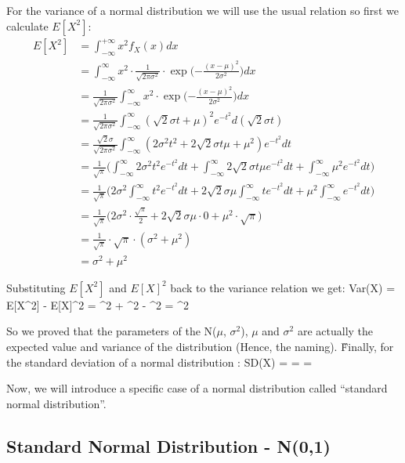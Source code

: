For the variance of a normal distribution we will use the usual relation so first we calculate $E[X^2]$:
\begingroup
\allowdisplaybreaks
{\setlength{\jot}{11pt}
\begin{align*}
E[X^2] &= \int_{-\infty}^{+\infty} x^2 f_{X}(x) dx \\
&= \int_{-\infty}^\infty x^2 \cdot \frac{1}{\sqrt{2\pi\sigma^2}}
\cdot \exp \Big( {-\frac{(x - \mu)^2}{2\sigma^2}} \Big) dx \\
&= \frac{1}{\sqrt{2\pi\sigma^2}} \int_{-\infty}^\infty x^2 \cdot \exp \Big( {-\frac{(x - \mu)^2}{2\sigma^2}} \Big) dx\\
&= \frac{1}{\sqrt{2\pi\sigma^2}} \int_{-\infty}^\infty (\sqrt{2} \sigma t + \mu)^2 e^{-t^2} d (\sqrt{2} \sigma t) \\
&= \frac{\sqrt{2} \sigma}{\sqrt{2\pi\sigma^2}} \int_{-\infty}^\infty (2 \sigma^2 t^2
+ 2 \sqrt{2} \sigma t \mu + \mu^2) e ^ {-t^2} dt\\
&= \frac{1}{\sqrt{\pi}} \Big( \int_{-\infty}^\infty 2 \sigma^2 t^2 e^ {-t^2} dt
+ \int_{-\infty}^\infty 2 \sqrt{2} \sigma t \mu e ^ {-t^2} dt + \int_{-\infty}^\infty \mu^2 e^ {-t^2} dt \Big) \\
&= \frac{1}{\sqrt{\pi}} \Big( 2 \sigma^2 \int_{-\infty}^\infty t^2 e^ {-t^2} dt
+ 2 \sqrt{2} \sigma \mu \int_{-\infty}^\infty t e ^ {-t^2} dt + \mu^2 \int_{-\infty}^\infty e ^ {-t^2} dt \Big) \\
&= \frac{1}{\sqrt{\pi}} \Big( 2 \sigma^2 \cdot \frac{\sqrt{\pi}}{2} + 2 \sqrt{2} \sigma \mu \cdot 0
+ \mu^2 \cdot \sqrt{\pi} \Big) \\
&= \frac{1}{\sqrt{\pi}} \cdot \sqrt{\pi} \cdot (\sigma^2 + \mu^2 )\\
&= \sigma^2 + \mu^2
\end{align*}}
\endgroup

Substituting $E[X^2]$ and $E[X]^2$ back to the variance relation we get:
\bse
Var(X) = E[X^2] - E[X]^2 = \sigma^2 + \mu^2 - \mu^2 = \sigma^2
\ese

So we proved that the parameters of the N($\mu$, $\sigma^2$), $\mu$ and $\sigma^2$ are actually the expected value
and variance of the distribution (Hence, the naming). \v

Finally, for the standard deviation of a normal distribution :
\bse
SD(X) =  =  = \sigma
\ese

Now, we will introduce a specific case of a normal distribution called ``standard normal distribution''.

\subsection{Standard Normal Distribution - N(0,1)}

